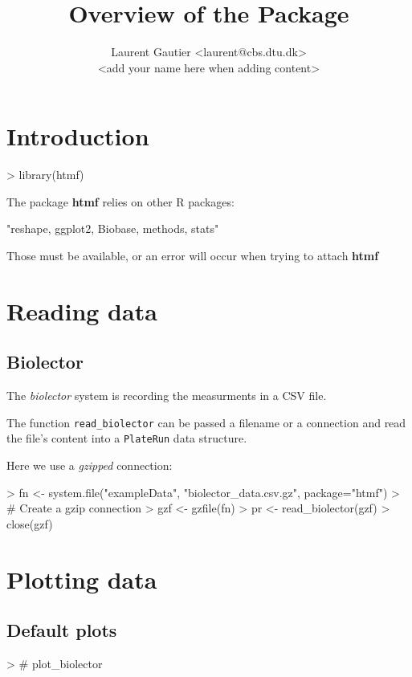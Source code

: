 \documentclass[a4paper,twoside]{article}
\title{Overview of the \pkg{htmf} Package}
\author{Laurent Gautier <laurent@cbs.dtu.dk>\\
        <add your name here when adding content>}
\newcommand{\pkg}{\textbf}
\begin{document}
\maketitle

\section{Introduction}


\begin{Schunk}
\begin{Sinput}
> library(htmf)
\end{Sinput}
\end{Schunk}

The package \pkg{htmf} relies on other R packages:
\begin{Schunk}
\begin{Soutput}
[1] "reshape, ggplot2, Biobase, methods, stats"
\end{Soutput}
\end{Schunk}
Those must be available, or an error will occur when trying to attach \pkg{htmf}


\section{Reading data}

\subsection{Biolector}

The {\it biolector} system is recording the measurments in a CSV file.

The function \verb+read_biolector+ can be passed a filename or a connection
and read the file's content into a \verb+PlateRun+ data structure.

Here we use a {\it gzipped} connection:
\begin{Schunk}
\begin{Sinput}
> fn <- system.file("exampleData", "biolector_data.csv.gz", package="htmf")
> # Create a gzip connection
> gzf <- gzfile(fn)
> pr <- read_biolector(gzf)
> close(gzf)
\end{Sinput}
\end{Schunk}


\section{Plotting data}

\subsection{Default plots}
\begin{Schunk}
\begin{Sinput}
> # plot_biolector 
\end{Sinput}
\end{Schunk}
\end{document}
